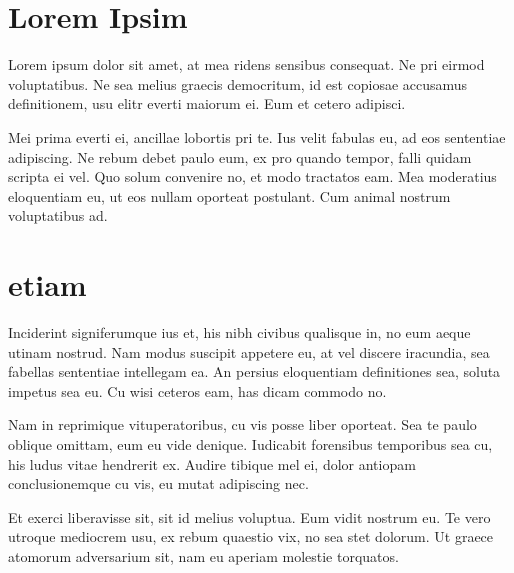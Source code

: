\documentclass[12pt,a4paper]{report}
\begin{document}
\section*{Lorem Ipsim}
Lorem ipsum dolor sit amet, at mea ridens sensibus consequat. Ne pri eirmod voluptatibus. Ne sea melius graecis democritum, id est copiosae accusamus definitionem, usu elitr everti maiorum ei. Eum et cetero adipisci.

Mei prima everti ei, ancillae lobortis pri te. Ius velit fabulas eu, ad eos sententiae adipiscing. Ne rebum debet paulo eum, ex pro quando tempor, falli quidam scripta ei vel. Quo solum convenire no, et modo tractatos eam. Mea moderatius eloquentiam eu, ut eos nullam oporteat postulant. Cum animal nostrum voluptatibus ad.
\section*{etiam}
Inciderint signiferumque ius et, his nibh civibus qualisque in, no eum aeque utinam nostrud. Nam modus suscipit appetere eu, at vel discere iracundia, sea fabellas sententiae intellegam ea. An persius eloquentiam definitiones sea, soluta impetus sea eu. Cu wisi ceteros eam, has dicam commodo no.

Nam in reprimique vituperatoribus, cu vis posse liber oporteat. Sea te paulo oblique omittam, eum eu vide denique. Iudicabit forensibus temporibus sea cu, his ludus vitae hendrerit ex. Audire tibique mel ei, dolor antiopam conclusionemque cu vis, eu mutat adipiscing nec.

Et exerci liberavisse sit, sit id melius voluptua. Eum vidit nostrum eu. Te vero utroque mediocrem usu, ex rebum quaestio vix, no sea stet dolorum. Ut graece atomorum adversarium sit, nam eu aperiam molestie torquatos.
\end{document}
